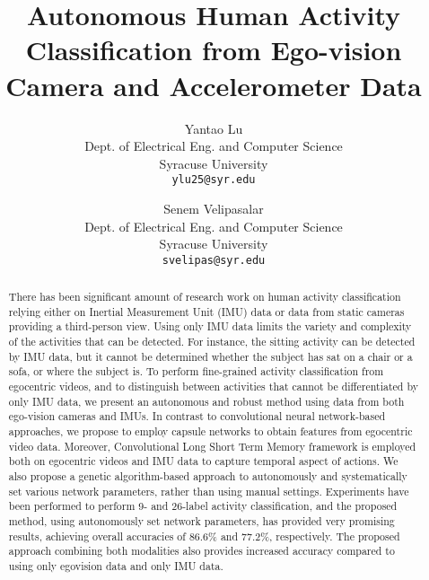 \documentclass[10pt,twocolumn,letterpaper]{article}
\begin{document}
\title{\vspace{-0.95cm}Autonomous Human Activity Classification from Ego-vision Camera and Accelerometer Data \vspace{-0.3cm}}

\author{Yantao Lu\\
Dept. of Electrical Eng. and Computer Science\\
Syracuse University\\
{\tt\small ylu25@syr.edu} \vspace{-0.45cm}
\and
Senem Velipasalar\\
Dept. of Electrical Eng. and Computer Science\\
Syracuse University\\
{\tt\small svelipas@syr.edu} \vspace{-0.45cm}
}

\maketitle


\begin{abstract} \vspace{-0.2cm}
  There has been significant amount of research work on human activity classification relying either on Inertial Measurement Unit (IMU) data or data from static cameras providing a third-person view. Using only IMU data limits the variety and complexity of the activities that can be detected. For instance, the sitting activity can be detected by IMU data, but it cannot be determined whether the subject has sat on a chair or a sofa, or where the subject is. To perform fine-grained activity classification from egocentric videos, and to distinguish between activities that cannot be differentiated by only IMU data, we present an autonomous and robust method using data from both ego-vision cameras and IMUs. In contrast to convolutional neural network-based approaches, we propose to employ capsule networks to obtain features from egocentric video data. Moreover, Convolutional Long Short Term Memory framework is employed both on egocentric videos and IMU data to capture temporal aspect of actions. We also propose a genetic algorithm-based approach to autonomously and systematically set various network parameters, rather than using manual settings. Experiments have been performed to perform 9- and 26-label activity classification, and the proposed method, using autonomously set network parameters, has provided very promising results, achieving overall accuracies of 86.6\% and 77.2\%, respectively. The proposed approach combining both modalities also provides increased accuracy compared to using only egovision data and only IMU data.
\end{abstract}
\end{document}
